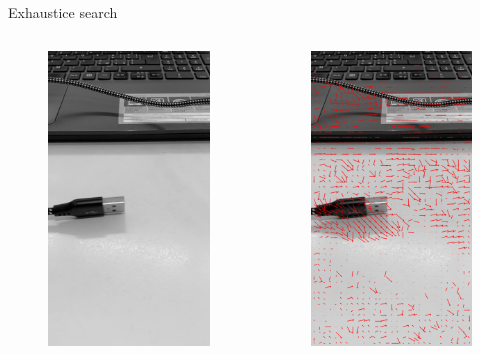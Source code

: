 \documentclass[aspectratio=1610,xcolor=dvipsnames]{beamer}
\begin{document}
\begin{frame}{Exhaustice search}
	\begin{columns}
		\begin{column}{0.5\textwidth}
			\begin{figure}
				\centering
				\includegraphics[keepaspectratio, width=.5\linewidth]{images/bbme-im.png}
			\end{figure}
		\end{column}
		\begin{column}{0.5\textwidth}
			\begin{figure}
				\centering
				\includegraphics[keepaspectratio, width=.5\linewidth]{images/bbme-0-res.png}
			\end{figure}
		\end{column}
	\end{columns}
\end{frame}
\end{document}

